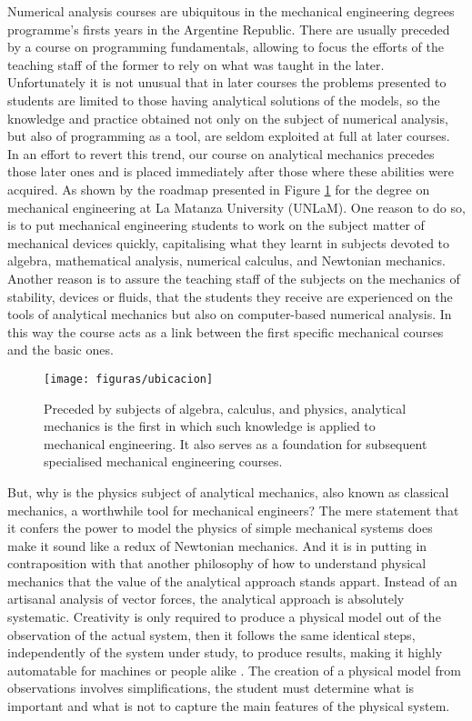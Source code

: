 Numerical analysis courses are ubiquitous in the mechanical engineering degrees programme's firsts years in the Argentine Republic.
There are usually preceded by a course on programming fundamentals, allowing to focus the efforts of the teaching staff of the former to rely on what was taught in the later.
Unfortunately it is not unusual that in later courses the problems presented to students are limited to those 
having analytical solutions of the models, so the knowledge and practice obtained not only on the subject of numerical analysis, but also of programming as a tool, are seldom exploited at full at later courses.
In an effort to revert this trend, our course on analytical mechanics precedes those later ones and is placed immediately after those where these abilities were acquired. 
As shown by the roadmap presented in Figure \ref{fig:correlativas} for the degree on mechanical engineering at La Matanza University (UNLaM).
One reason to do so, is to put mechanical engineering students to work on the subject matter of mechanical devices quickly, capitalising what they learnt in subjects devoted to algebra, mathematical analysis, numerical calculus, and Newtonian mechanics.
Another reason is to assure the teaching staff of the subjects on the mechanics of stability, devices or fluids, that the students they receive are experienced on the tools of analytical mechanics but also on computer-based numerical analysis.
In this way the course acts as a link between the first specific mechanical courses and the basic ones.

\begin{figure}[ht]
\centering
\texttt{[image: figuras/ubicacion]}
\caption{Preceded by subjects of algebra, calculus, and physics, analytical mechanics is the first in which such knowledge is applied to mechanical engineering.
It also serves as a foundation for subsequent specialised mechanical engineering courses.}
\label{fig:correlativas}
\end{figure}

But, why is the physics subject of analytical mechanics, also known as classical mechanics, a worthwhile tool for mechanical engineers? 
The mere statement that it confers the power to model the physics of simple mechanical systems does make it sound like a redux of Newtonian mechanics.
And it is in putting in contraposition with that another philosophy of how to understand physical mechanics that the value of the analytical approach stands appart.
Instead of an artisanal analysis of vector forces, the analytical approach is absolutely systematic.
Creativity is only required to produce a physical model out of the observation of the actual system, then it follows the same identical steps, independently of the system under study, to produce results, making it highly automatable for machines or people alike \cite{cornelius_lanczos_variational_1952}.
The creation of a physical model from observations involves simplifications, the student must determine what is important and what is not to capture the main features of the physical system.

